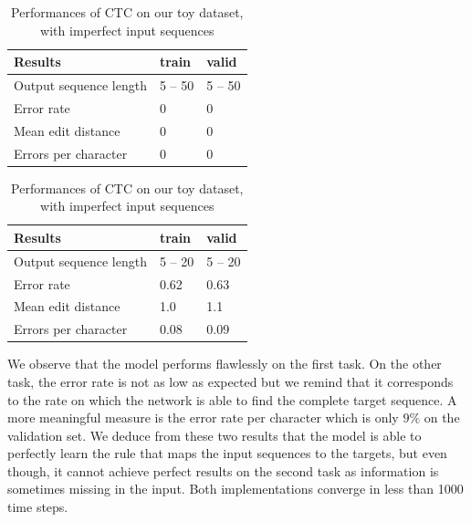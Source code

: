 \documentclass[11pt,a4paper]{article}
\begin{document}
\begin{table}[H]
    \centering
    \vspace{2ex}
	\begin{minipage}{0.45\textwidth}
    \begin{tabular}{l l l}
		\hline
        \textbf{Results} & \textbf{train} & \textbf{valid}\\ 
		\hline
        Output sequence length & 5 -- 50 & 5 -- 50 \\
        Error rate & 0 & 0 \\
        Mean edit distance & 0 & 0 \\ 
        Errors per character & 0 & 0 \\
		\hline
    \end{tabular}
    \caption{Performances of CTC on our toy dataset, with perfect input sequences}
	\label{tbl_result}
	\end{minipage}
	\hfill{}
	\begin{minipage}{0.45\textwidth}
    \begin{tabular}{l l l}
		\hline
        \textbf{Results} & \textbf{train} & \textbf{valid}\\ 
		\hline
        Output sequence length & 5 -- 20 & 5 -- 20 \\
        Error rate & 0.62 & 0.63 \\
        Mean edit distance & 1.0 & 1.1 \\ 
        Errors per character & 0.08 & 0.09 \\
		\hline
    \end{tabular}
    \caption{Performances of CTC on our toy dataset, with imperfect input sequences}
	\label{tbl_result2}
	\end{minipage}
\end{table}

We observe that the model performs flawlessly on the first task. On the other task, the error rate is not as low as expected but we remind that it corresponds to the rate on which the network is able to find the complete target sequence. A more meaningful measure is the error rate per character which is only $9\%$ on the validation set. We deduce from these two results that the model is able to perfectly learn the rule that maps the input sequences to the targets, but even though, it cannot achieve perfect results on the second task as information is sometimes missing in the input. Both implementations converge in less than 1000 time steps. 
\end{document}

